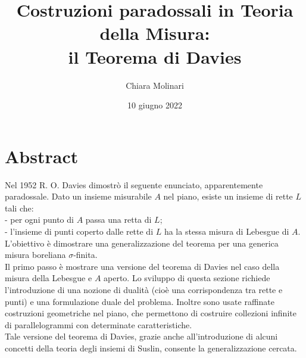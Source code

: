 \documentclass[11pt]{article}
\title{Costruzioni paradossali in Teoria della Misura:\\
	il Teorema di Davies}
\author{Chiara Molinari}
\date{10 giugno 2022} %
\newcommand{\<}{\langle}
\renewcommand{\>}{\rangle}
\begin{document}
	
\maketitle

\section*{Abstract}
	
	Nel 1952 R. O. Davies dimostrò il seguente enunciato, apparentemente paradossale. Dato un insieme misurabile $A$ nel piano, esiste un insieme di rette $L$ tali che:\\
	- per ogni punto di $A$ passa una retta di $L$;\\
	- l'insieme di punti coperto dalle rette di $L$ ha la stessa misura di Lebesgue di $A$.\\
	L'obiettivo è dimostrare una generalizzazione del teorema per una generica misura boreliana $\sigma$-finita.\\
	Il primo passo è mostrare una versione del teorema di Davies nel caso della misura della Lebesgue e $A$ aperto. Lo sviluppo di questa sezione richiede l'introduzione di una nozione di dualità (cioè una corrispondenza tra rette e punti) e una formulazione duale del problema. Inoltre sono usate raffinate costruzioni geometriche nel piano, che permettono di costruire collezioni infinite di parallelogrammi con determinate caratteristiche.\\
	Tale versione del teorema di Davies, grazie anche all'introduzione di alcuni concetti della teoria degli insiemi di Suslin, consente la generalizzazione cercata.
	
	
	
\end{document}

